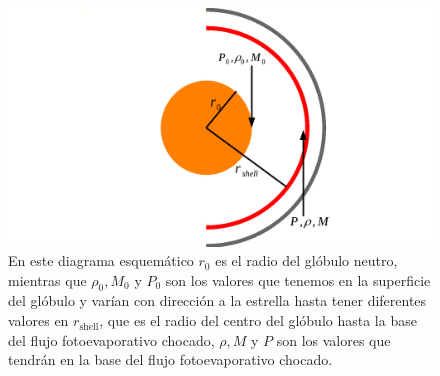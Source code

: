 \documentclass{book}
\begin{document}
\begin{figure}[htb]
    \centering \includegraphics[width=\textwidth]{imagenes_corregidas/Arreglo 02_n.pdf}
    \caption{En este diagrama esquemático $r_0$ es el radio del glóbulo neutro, mientras que $\rho_0,M_0$ y $P_0$ son los valores que tenemos en la superficie del glóbulo y varían con dirección a la estrella hasta tener diferentes valores en $r_\mathrm{shell}$, que es el radio del centro del glóbulo hasta la base del flujo fotoevaporativo chocado, $\rho,M$ y $P$ son los valores que tendrán en la base del flujo fotoevaporativo chocado.}
    \label{fig:parameters}
\end{figure}
\end{document}
